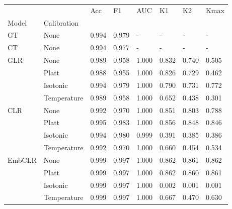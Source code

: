 \begin{tabular}{llllllll}
\toprule
 &  & Acc & F1 & AUC & K1 & K2 & Kmax \\
Model & Calibration &  &  &  &  &  &  \\
\midrule
GT & None & 0.994 & 0.979 & - & - & - & - \\
\cline{1-8}
CT & None & 0.994 & 0.977 & - & - & - & - \\
\cline{1-8}
\multirow[t]{4}{*}{GLR} & None & 0.989 & 0.958 & 1.000 & 0.832 & 0.740 & 0.505 \\
 & Platt & 0.988 & 0.955 & 1.000 & 0.826 & 0.729 & 0.462 \\
 & Isotonic & 0.994 & 0.979 & 1.000 & 0.790 & 0.731 & 0.772 \\
 & Temperature & 0.989 & 0.958 & 1.000 & 0.652 & 0.438 & 0.301 \\
\cline{1-8}
\multirow[t]{4}{*}{CLR} & None & 0.992 & 0.970 & 1.000 & 0.851 & 0.803 & 0.788 \\
 & Platt & 0.995 & 0.983 & 1.000 & 0.856 & 0.848 & 0.846 \\
 & Isotonic & 0.994 & 0.980 & 0.999 & 0.391 & 0.385 & 0.386 \\
 & Temperature & 0.992 & 0.970 & 1.000 & 0.660 & 0.454 & 0.534 \\
\cline{1-8}
\multirow[t]{4}{*}{EmbCLR} & None & 0.999 & 0.997 & 1.000 & 0.862 & 0.861 & 0.862 \\
 & Platt & 0.999 & 0.997 & 1.000 & 0.862 & 0.860 & 0.861 \\
 & Isotonic & 0.999 & 0.997 & 1.000 & 0.002 & 0.001 & 0.001 \\
 & Temperature & 0.999 & 0.997 & 1.000 & 0.667 & 0.470 & 0.630 \\
\cline{1-8}
\bottomrule
\end{tabular}
